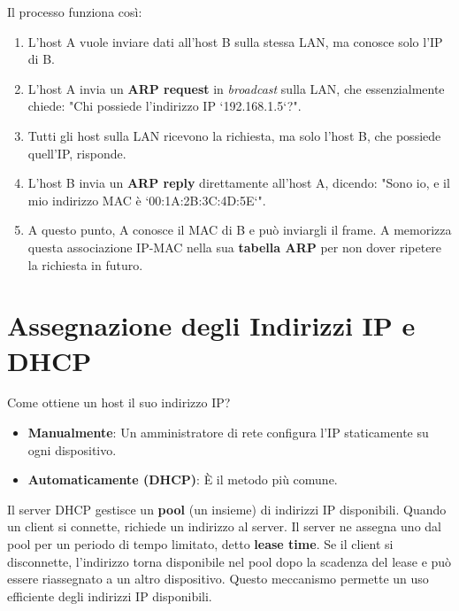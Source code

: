 Il processo funziona così:
\begin{enumerate}
    \item L'host A vuole inviare dati all'host B sulla stessa LAN, ma conosce solo l'IP di B.
    \item L'host A invia un \textbf{ARP request} in \textit{broadcast} sulla LAN, che essenzialmente chiede: "Chi possiede l'indirizzo IP `192.168.1.5`?".
    \item Tutti gli host sulla LAN ricevono la richiesta, ma solo l'host B, che possiede quell'IP, risponde.
    \item L'host B invia un \textbf{ARP reply} direttamente all'host A, dicendo: "Sono io, e il mio indirizzo MAC è `00:1A:2B:3C:4D:5E`".
    \item A questo punto, A conosce il MAC di B e può inviargli il frame. A memorizza questa associazione IP-MAC nella sua \textbf{tabella ARP} per non dover ripetere la richiesta in futuro.
\end{enumerate}

\section{Assegnazione degli Indirizzi IP e DHCP}
Come ottiene un host il suo indirizzo IP?
\begin{itemize}
    \item \textbf{Manualmente}: Un amministratore di rete configura l'IP staticamente su ogni dispositivo.
    \item \textbf{Automaticamente (DHCP)}: È il metodo più comune.
\end{itemize}

Il server DHCP gestisce un \textbf{pool} (un insieme) di indirizzi IP disponibili. Quando un client si connette, richiede un indirizzo al server. Il server ne assegna uno dal pool per un periodo di tempo limitato, detto \textbf{lease time}. Se il client si disconnette, l'indirizzo torna disponibile nel pool dopo la scadenza del lease e può essere riassegnato a un altro dispositivo. Questo meccanismo permette un uso efficiente degli indirizzi IP disponibili.

